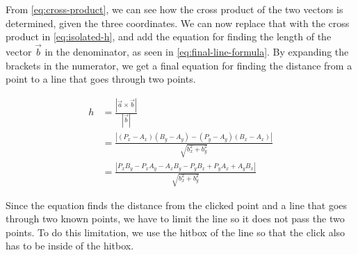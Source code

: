 From \eqref{eq:cross-product}, we can see how the cross product of the two vectors is determined, given the three coordinates.
We can now replace that with the cross product in \eqref{eq:isolated-h}, and add the equation for finding the length of the vector $\vec{b}$ in the denominator, as seen in \eqref{eq:final-line-formula}.
By expanding the brackets in the numerator, we get a final equation for finding the distance from a point to a line that goes through two points.

\begin{equation}\label{eq:final-line-formula}
\begin{aligned}
	h &= \frac{|\vec{a} \times \vec{b}|}{|\vec{b}|}\\
	  &= \frac{|(P_x-A_x)(B_y-A_y)-(P_y-A_y)(B_x-A_x)|}{\sqrt{b_x^2+b_y^2}}\\
	  &= \frac{|P_xB_y-P_xA_y-A_xB_y-P_yB_x+P_yA_x+A_yB_x|}{\sqrt{b_x^2+b_y^2}}
\end{aligned}
\end{equation}

Since the equation finds the distance from the clicked point and a line that goes through two known points, we have to limit the line so it does not pass the two points.
To do this limitation, we use the hitbox of the line so that the click also has to be inside of the hitbox.
